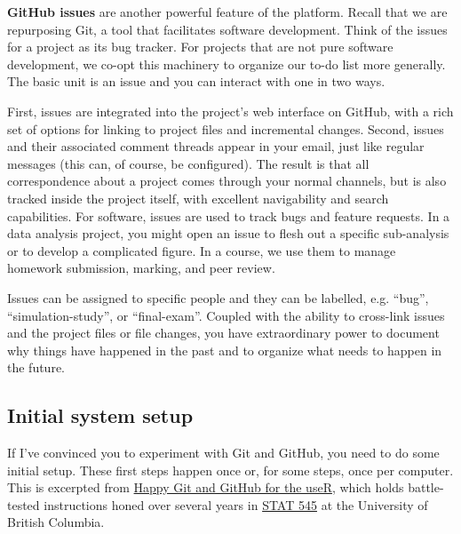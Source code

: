 \documentclass[12pt]{article}
\begin{document}
\textbf{GitHub issues} are another powerful feature of the platform.
Recall that we are repurposing Git, a tool that facilitates software
development. Think of the issues for a project as its bug tracker. For
projects that are not pure software development, we co-opt this
machinery to organize our to-do list more generally. The basic unit is
an issue and you can interact with one in two ways.

First, issues are integrated into the project's web interface on GitHub,
with a rich set of options for linking to project files and incremental
changes. Second, issues and their associated comment threads appear in
your email, just like regular messages (this can, of course, be
configured). The result is that all correspondence about a project comes
through your normal channels, but is also tracked inside the project
itself, with excellent navigability and search capabilities. For
software, issues are used to track bugs and feature requests. In a data
analysis project, you might open an issue to flesh out a specific
sub-analysis or to develop a complicated figure. In a course, we use
them to manage homework submission, marking, and peer review.

Issues can be assigned to specific people and they can be labelled, e.g.
``bug'', ``simulation-study'', or ``final-exam''. Coupled with the
ability to cross-link issues and the project files or file changes, you
have extraordinary power to document why things have happened in the
past and to organize what needs to happen in the future.

\subsection{Initial system setup}\label{initial-system-setup}

If I've convinced you to experiment with Git and GitHub, you need to do
some initial setup. These first steps happen once or, for some steps,
once per computer. This is excerpted from
\href{http://happygitwithr.com}{Happy Git and GitHub for the useR},
which holds battle-tested instructions honed over several years in
\href{http://stat545.com}{STAT 545} at the University of British
Columbia.
\end{document}
